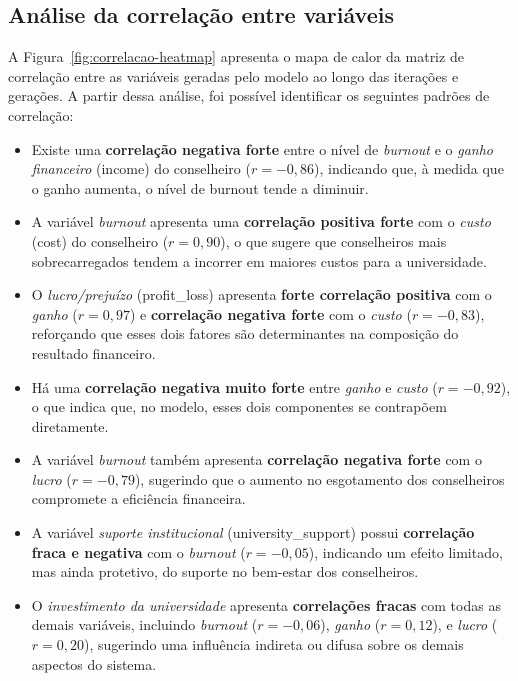 \documentclass[
	article,			%
	11pt,				%
	oneside,			%
	a4paper,			%
	english,			%
	brazil,				%
	sumario=tradicional
	]{abntex2}
\begin{document}
\subsection{Análise da correlação entre variáveis}

A Figura~\ref{fig:correlacao-heatmap} apresenta o mapa de calor da matriz de correlação entre as variáveis geradas pelo modelo ao longo das iterações e gerações. A partir dessa análise, foi possível identificar os seguintes padrões de correlação:

\begin{sloppypar}
\begin{itemize}
    \item Existe uma \textbf{correlação negativa forte} entre o nível de \textit{burnout} e o \textit{ganho financeiro} (income) do conselheiro ($r = -0{,}86$), indicando que, à medida que o ganho aumenta, o nível de burnout tende a diminuir.
    \item A variável \textit{burnout} apresenta uma \textbf{correlação positiva forte} com o \textit{custo} (cost) do conselheiro ($r = 0{,}90$), o que sugere que conselheiros mais sobrecarregados tendem a incorrer em maiores custos para a universidade.
    \item O \textit{lucro/prejuízo} (profit\_loss) apresenta \textbf{forte correlação positiva} com o \textit{ganho} ($r = 0{,}97$) e \textbf{correlação negativa forte} com o \textit{custo} ($r = -0{,}83$), reforçando que esses dois fatores são determinantes na composição do resultado financeiro.
    \item Há uma \textbf{correlação negativa muito forte} entre \textit{ganho} e \textit{custo} ($r = -0{,}92$), o que indica que, no modelo, esses dois componentes se contrapõem diretamente.
    \item A variável \textit{burnout} também apresenta \textbf{correlação negativa forte} com o \textit{lucro} ($r = -0{,}79$), sugerindo que o aumento no esgotamento dos conselheiros compromete a eficiência financeira.
    \item A variável \textit{suporte institucional} (university\_support) possui \textbf{correlação fraca e negativa} com o \textit{burnout} ($r = -0{,}05$), indicando um efeito limitado, mas ainda protetivo, do suporte no bem-estar dos conselheiros.
    \item O \textit{investimento da universidade} apresenta \textbf{correlações fracas} com todas as demais variáveis, incluindo \textit{burnout} ($r = -0{,}06$), \textit{ganho} ($r = 0{,}12$), e \textit{lucro} ($r = 0{,}20$), sugerindo uma influência indireta ou difusa sobre os demais aspectos do sistema.
\end{itemize}
\end{sloppypar}
\end{document}
